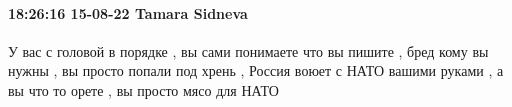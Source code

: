  
 
 
 
 

\paragraph{18:26:16 15-08-22 Tamara Sidneva}

У вас с головой в порядке , вы сами понимаете что вы пишите , бред кому вы
нужны , вы просто попали под хрень , Россия воюет с НАТО вашими руками , а вы
что то орете , вы просто мясо для НАТО
